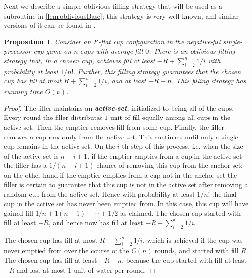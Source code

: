 \documentclass[twocolumn]{article}[10pt]
\newcommand{\defn}[1]{{\textit{\textbf{\boldmath #1}}}\xspace}
\newtheorem{proposition}{Proposition}
\begin{document}
Next we describe a simple oblivious filling strategy that will be used as a
subroutine in \cref{lem:obliviousBase}; this strategy is very
well-known, and similar versions of it can be found in
\cite{ mbe19, mbe15, die91, wku20}.
\begin{proposition}
  \label{prop:obliviousTerribleProbability}
  Consider an $R$-flat cup configuration in the negative-fill
  single-processor cup game on $n$ cups with average fill $0$.
  There is an oblivious filling strategy that, in a chosen cup,
  achieves fill at least $-R + \sum_{i=2}^{n} 1/i$ with
  probability at least $1/n!$. Further, this filling strategy
  guarantees that the chosen cup has fill at most $R +
  \sum_{i=2}^{n} 1/i$, and at least $-R-n$. This filling strategy
  has running time $O(n)$.
\end{proposition}
\begin{proof}
  The filler maintains an \defn{active-set}, initialized to being
  all of the cups. Every round the filler distributes $1$ unit of
  fill equally among all cups in the active set. Then the emptier
  removes fill from some cup. Finally, the filler removes a cup
  randomly from the active set. This continues until only a single cup
  remains in the active set. On the $i$-th step of this process,
  i.e. when the size of the active set is $n-i+1$, if the emptier
  empties from a cup in the active set the filler has a
  $1/(n-i+1)$ chance of removing this cup from the anchor set; on
  the other hand if the emptier empties from a cup not in the
  anchor set the filler is certain to guarantee that this cup is
  not in the active set after removing a random cup from the
  active set. Hence with probability at least $1/n!$ the final
  cup in the active set has never been emptied from.
  In this case, this cup will have gained fill $1/n+1(n-1) +
  \cdots + 1/2$ as claimed. The chosen cup started with fill at
  least $-R$, and hence now has fill at least $-R+ \sum_{i=2}^n
  1/i$. 

  The chosen cup has fill at most $R + \sum_{i=2}^n 1/i$, which
  is achieved if the cup was never emptied from over the course
  of the $O(n)$ rounds, and started with fill $R$. 
  The chosen cup has fill at least $-R - n$, because the cup
  started with fill at least $-R$ and lost at most $1$ unit of
  water per round.

\end{proof}
\end{document}
